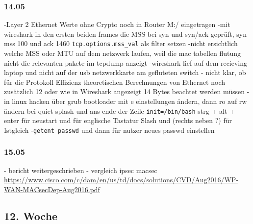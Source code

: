 \documentclass[english,runningheads,a4paper]{llncs}[2018/03/10]
\begin{document}
\subsubsection{14.05}
-Layer 2 Ethernet Werte ohne Crypto noch in Router M:/ eingetragen
-mit wireshark in den ersten beiden frames die MSS bei syn und syn/ack geprüft, syn mss 100 und ack 1460 \texttt{tcp.options.mss\_val} als filter setzen
-nicht ersichtlich welche MSS oder MTU auf dem netzwerk laufen, weil die mac tabellen flutung nicht die relevanten pakete im tcpdump anzeigt
-wireshark lief auf dem recieving laptop und nicht auf der usb netzwerkkarte am gefluteten switch
- nicht klar, ob für die Protokoll Effizienz theoretischen Berechnungen von Ethernet noch zusätzlich 12 oder wie in Wireshark angezeigt 14 Bytes beachtet werden müssen
-in linux hacken über grub bootloader mit e einstellungen ändern, dann ro auf rw ändern bei quiet splash und ans ende der Zeile \texttt{init=/bin/bash} strg + alt + enter für neustart und \qq{-} für englische Tastatur Slash und (rechts neben ?) für Istgleich
-\texttt{getent passwd} und dann für nutzer neues passwd einstellen
\subsubsection{15.05}
- bericht weitergeschrieben
- vergleich ipsec macsec \url{https://www.cisco.com/c/dam/en/us/td/docs/solutions/CVD/Aug2016/WP-WAN-MACsecDep-Aug2016.pdf}
\subsection{12. Woche}
\end{document}

